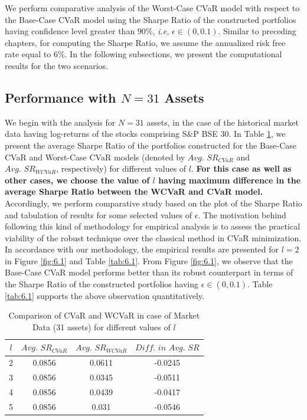 We perform comparative analysis of the Worst-Case CVaR model with respect to the Base-Case CVaR model using the Sharpe Ratio of the constructed portfolios having confidence level greater than $90\%$, \textit{i.e,} $\epsilon \in (0,0.1)$. Similar to preceding chapters, for computing the Sharpe Ratio, we assume the annualized risk free rate equal to $6\%$. In the following subsections, we present the computational results for the two scenarios.

\subsection{Performance with $N=31$ Assets}



We begin with the analysis for $N=31$ assets, in the case of the historical market data having log-returns of the stocks comprising S\&P BSE 30. In Table \ref{avgtab:6.1}, we present the average Sharpe Ratio of the portfolios constructed for the Base-Case CVaR and Worst-Case CVaR models (denoted by $Avg. \, \, SR_{CVaR}$ and $Avg. \, \, SR_{WCVaR}$, respectively) for different values of $l$. \textbf{For this case as well as other cases, we choose the value of $l$ having maximum difference in the average Sharpe Ratio between the WCVaR and CVaR model.} Accordingly, we perform comparative study based on the plot of the Sharpe Ratio and tabulation of results for some selected values of $\epsilon$. The motivation behind following this kind of methodology for empirical analysis is to assess the practical viability of the robust technique over the classical method in CVaR minimization. In accordance with our methodology, the empirical results are presented for $l=2$ in Figure \ref{fig:6.1} and Table \ref{tab:6.1}. From Figure \ref{fig:6.1}, we observe that the Base-Case CVaR model performs better than its robust counterpart in terms of the Sharpe Ratio of the constructed portfolios having $\epsilon \in (0,0.1)$. Table \ref{tab:6.1} supports the above observation quantitatively.

\begin{table}[!h]
    \centering
    \captionsetup{justification=centering}

   \begin{tabular}{||c|c|c|c||}
   \hline
  
$l$ & $Avg. \, \, SR_{CVaR}$ & $Avg. \, \, SR_{WCVaR}$ & $Diff. \, \, in \, \, Avg. \, \, SR$ \\
  
  \hline
2 & 0.0856 & 0.0611 & -0.0245 \\
3 & 0.0856 & 0.0345 & -0.0511 \\
4 & 0.0856 & 0.0439 & -0.0417 \\
5 & 0.0856 & 0.031 & -0.0546 \\
  \hline
\end{tabular}
    \caption{Comparison of CVaR and WCVaR in case of Market Data (31 assets) for different values of $l$}
    \label{avgtab:6.1}
\end{table}

